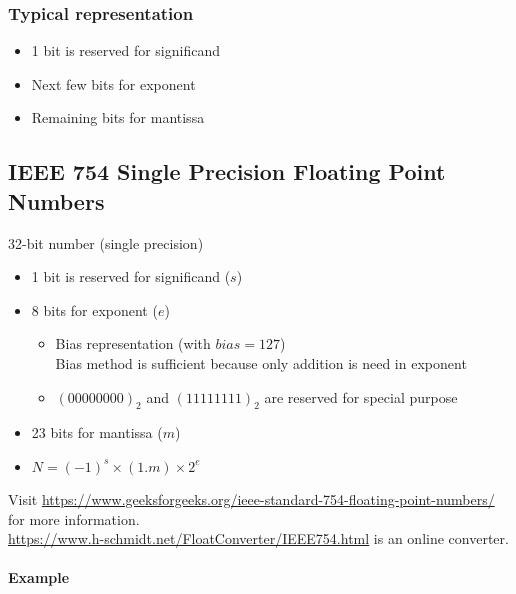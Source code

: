 \documentclass[oneside]{book}
\begin{document}
\subsubsection{Typical representation}
\begin{itemize}
	\item 1 bit is reserved for significand
	\item Next few bits for exponent
	\item Remaining bits for mantissa
\end{itemize}

\subsection{IEEE 754 Single Precision Floating Point Numbers}
32-bit number (single precision)
\begin{itemize}
	\item 1 bit is reserved for significand ($s$)
	\item 8 bits for exponent ($e$)
	      \begin{itemize}
		      \item Bias representation (with $bias=127$)\\
		            Bias method is sufficient because only addition is need in exponent
		      \item $(0000 0000)_2$ and $(1111 1111)_2$ are reserved for special purpose
	      \end{itemize}
	\item 23 bits for mantissa ($m$)
	\item \(N = (-1)^s \times (1.m)\times 2^e\)
\end{itemize}
\cite{ieee_745_floating_point_number} Visit \url{https://www.geeksforgeeks.org/ieee-standard-754-floating-point-numbers/} for more information.\\
\cite{ieee_745_floating_point_number_converter} \url{https://www.h-schmidt.net/FloatConverter/IEEE754.html} is an online converter.
\\\\\noindent\textbf{Example}\\
\end{document}
